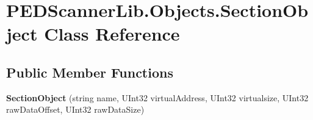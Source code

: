 \hypertarget{class_p_e_d_scanner_lib_1_1_objects_1_1_section_object}{}\section{P\+E\+D\+Scanner\+Lib.\+Objects.\+Section\+Object Class Reference}
\label{class_p_e_d_scanner_lib_1_1_objects_1_1_section_object}
\subsection*{Public Member Functions}
\begin{DoxyCompactItemize}
\item 
\mbox{\label{class_p_e_d_scanner_lib_1_1_objects_1_1_section_object_a5930a45481fc2b5a3d152e8292cea5b8}} 
{\bfseries Section\+Object} (string name, U\+Int32 virtual\+Address, U\+Int32 virtualsize, U\+Int32 raw\+Data\+Offset, U\+Int32 raw\+Data\+Size)
\end{DoxyCompactItemize}
